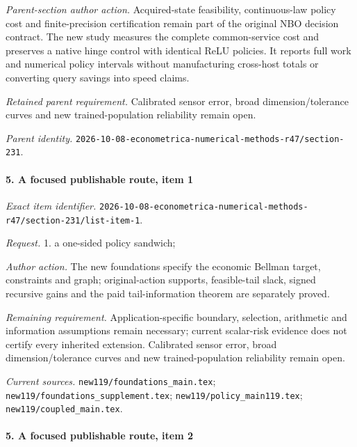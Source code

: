 \emph{Parent-section author action.} Acquired-state feasibility, continuous-law policy cost and finite-precision certification remain part of the original NBO decision contract. The new study measures the complete common-service cost and preserves a native hinge control with identical ReLU policies. It reports full work and numerical policy intervals without manufacturing cross-host totals or converting query savings into speed claims.

\par\emph{Retained parent requirement.} Calibrated sensor error, broad dimension/\allowbreak{}tolerance curves and new trained-population reliability remain open.

\par\emph{Parent identity.} \nolinkurl{2026-10-08-econometrica-numerical-methods-r47/section-231}.

\paragraph{5. A focused publishable route, item 1}

\emph{Exact item identifier.} \nolinkurl{2026-10-08-econometrica-numerical-methods-r47/section-231/list-item-1}.

\par\emph{Request.} 1. a one-sided policy sandwich;

\par\emph{Author action.} The new foundations specify the economic Bellman target, constraints and graph; original-action supports, feasible-tail slack, signed recursive gains and the paid tail-information theorem are separately proved.

\par\emph{Remaining requirement.} Application-specific boundary, selection, arithmetic and information assumptions remain necessary; current scalar-risk evidence does not certify every inherited extension. Calibrated sensor error, broad dimension/\allowbreak{}tolerance curves and new trained-population reliability remain open.

\par\emph{Current sources.} \nolinkurl{new119/foundations_main.tex}; \nolinkurl{new119/foundations_supplement.tex}; \nolinkurl{new119/policy_main119.tex}; \nolinkurl{new119/coupled_main.tex}.

\paragraph{5. A focused publishable route, item 2}

